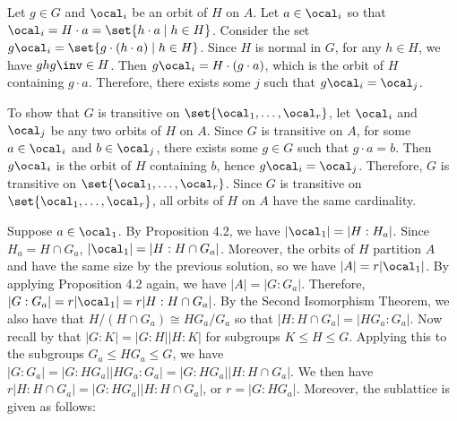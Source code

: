 \begin{solenum}[spsol]
	\item Let $g \in G$ and $\ocal_i$ be an orbit of $H$ on $A$.
	Let $a \in \ocal_i$ so that $\ocal_i = H \cdot a = \set{h \cdot a \mid h \in H}$.
	Consider the set $g\ocal_i = \set{g \cdot (h \cdot a) \mid h \in H}$.
	Since $H$ is normal in $G$, for any $h \in H$, we have $ghg\inv \in H$.
	Then $g\ocal_i = H \cdot (g \cdot a)$, which is the orbit of $H$ containing $g \cdot a$.
	Therefore, there exists some $j$ such that $g\ocal_i = \ocal_j$.
	
	To show that $G$ is transitive on $\set{\ocal_1, \ldots, \ocal_r}$, let $\ocal_i$ and $\ocal_j$ be any two orbits of $H$ on $A$.
	Since $G$ is transitive on $A$, for some $a \in \ocal_i$ and $b \in \ocal_j$, there exists some $g \in G$ such that $g \cdot a = b$.
	Then $g\ocal_i$ is the orbit of $H$ containing $b$, hence $g\ocal_i = \ocal_j$.
	Therefore, $G$ is transitive on $\set{\ocal_1, \ldots, \ocal_r}$.
	Since $G$ is transitive on $\set{\ocal_1, \ldots, \ocal_r}$, all orbits of $H$ on $A$ have the same cardinality.
	\item Suppose $a \in \ocal_1$.
	By Proposition 4.2, we have $|\ocal_1| = |H : H_a|$.
	Since $H_a = H \cap G_a$, $|\ocal_1| = |H : H \cap G_a|$.
	Moreover, the orbits of $H$ partition $A$ and have the same size by the previous solution, so we have $|A| = r|\ocal_1|$.
	By applying Proposition 4.2 again, we have $|A| = |G : G_a|$.
	Therefore, $|G : G_a| = r|\ocal_1| = r|H : H \cap G_a|$.
	By the Second Isomorphism Theorem, we also have that $H/(H \cap G_a) \cong HG_a/G_a$ so that $|H : H \cap G_a| = |HG_a : G_a|$.
	Now recall by  that $|G : K| = |G : H||H : K|$ for subgroups $K \leq H \leq G$.
	Applying this to the subgroups $G_a \leq HG_a \leq G$, we have $|G : G_a| = |G : HG_a||HG_a : G_a| = |G : HG_a||H : H \cap G_a|.$ We then have $r|H : H \cap G_a| = |G : HG_a||H : H \cap G_a|$, or $r = |G : HG_a|$.
	Moreover, the sublattice is given as follows:
	\begin{center}
	\end{center}
\end{solenum}

